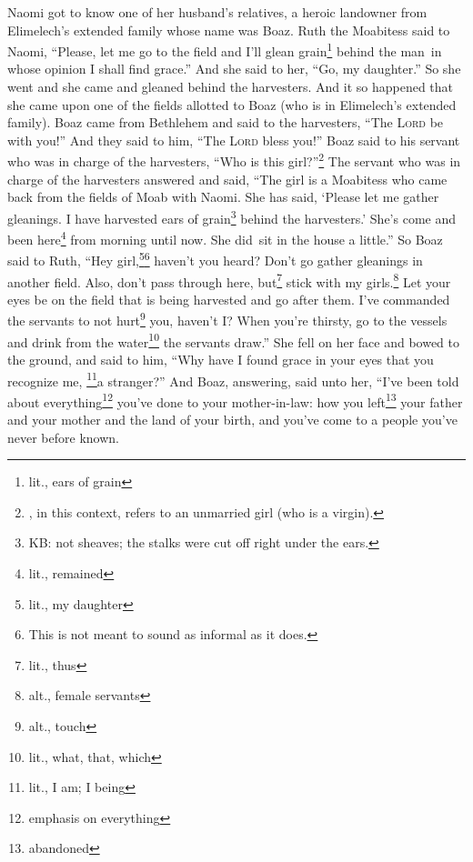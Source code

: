 
\begin{inparaenum}
     Naomi got to know one of her husband's relatives, a heroic landowner from Elimelech's extended family whose name was Boaz.%
     Ruth the Moabitess said to Naomi, ``Please, let me go to the field and I'll glean grain\footnote{lit., ears of grain} behind the man\understood\ in whose opinion I shall find grace.'' And she said to her, ``Go, my daughter.''%
     So she went and she came and gleaned behind the harvesters. And it so happened that she came upon one of the fields allotted to Boaz (who is in Elimelech's extended family).%
     Boaz came from Bethlehem and said to the harvesters, ``The \textsc{Lord} be with you!'' And they said to him, ``The \textsc{Lord} bless you!''%
     Boaz said to his servant who was in charge of the harvesters, ``Who is this girl?''\footnote{, in this context, refers to an unmarried girl (who is a virgin).}%
     The servant who was in charge of the harvesters answered and said, ``The girl is a Moabitess who came back from the fields of Moab with Naomi.%
     She has said, `Please let me gather gleanings. I have harvested ears of grain\footnote{KB: not sheaves; the stalks were cut off right under the ears.} behind the harvesters.' She's come and been here\footnote{lit., remained} from morning until now. She did\understood\ sit in the house a little.''%
     So Boaz said to Ruth, ``Hey girl,\footnote{lit., my daughter}\footnote{This is not meant to sound as informal as it does.} haven't you heard? Don't go gather gleanings in another field. Also, don't pass through here, but\footnote{lit., thus} stick with my girls.\footnote{alt., female servants}%
     Let your eyes be on the field that is being harvested and go after them. I've commanded the servants to not hurt\footnote{alt., touch} you, haven't I? When you're thirsty, go to the vessels and drink from the water\understood\footnote{lit., what, that, which} the servants draw.''%
     She fell on her face and bowed to the ground, and said to him, ``Why have I found grace in your eyes that you recognize me, \footnote{lit., I am; I being}a stranger?''%
     And Boaz, answering, said unto her, ``I've been told about everything\footnote{emphasis on everything} you've done to your mother-in-law: how you left\footnote{abandoned} your father and your mother and the land of your birth, and you've come to a people you've never before known.%

\end{inparaenum}
